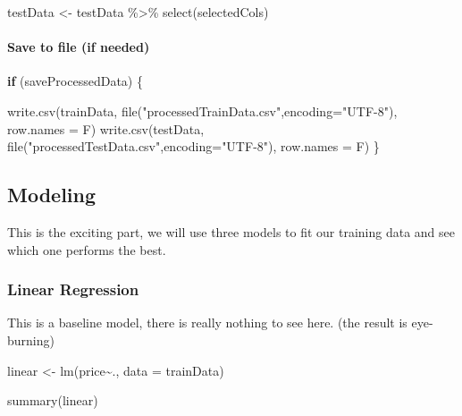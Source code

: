 \documentclass[
]{article}
\newenvironment{Shaded}{\begin{snugshade}}{\end{snugshade}}
\newcommand{\AttributeTok}[1]{\textcolor[rgb]{0.77,0.63,0.00}{#1}}
\newcommand{\ControlFlowTok}[1]{\textcolor[rgb]{0.13,0.29,0.53}{\textbf{#1}}}
\newcommand{\FunctionTok}[1]{\textcolor[rgb]{0.00,0.00,0.00}{#1}}
\newcommand{\NormalTok}[1]{#1}
\newcommand{\OtherTok}[1]{\textcolor[rgb]{0.56,0.35,0.01}{#1}}
\newcommand{\SpecialCharTok}[1]{\textcolor[rgb]{0.00,0.00,0.00}{#1}}
\newcommand{\StringTok}[1]{\textcolor[rgb]{0.31,0.60,0.02}{#1}}
\begin{document}
\begin{Shaded}
\begin{Highlighting}[]
\NormalTok{testData }\OtherTok{\textless{}{-}}\NormalTok{ testData }\SpecialCharTok{\%\textgreater{}\%} \FunctionTok{select}\NormalTok{(selectedCols)}
\end{Highlighting}
\end{Shaded}

\hypertarget{save-to-file-if-needed}{%
\paragraph{Save to file (if needed)}\label{save-to-file-if-needed}}

\begin{Shaded}
\begin{Highlighting}[]
\ControlFlowTok{if}\NormalTok{ (saveProcessedData) \{}
  
  \FunctionTok{write.csv}\NormalTok{(trainData,}
            \FunctionTok{file}\NormalTok{(}\StringTok{"processedTrainData.csv"}\NormalTok{,}\AttributeTok{encoding=}\StringTok{"UTF{-}8"}\NormalTok{),}
            \AttributeTok{row.names =}\NormalTok{ F)}
  \FunctionTok{write.csv}\NormalTok{(testData,}
            \FunctionTok{file}\NormalTok{(}\StringTok{"processedTestData.csv"}\NormalTok{,}\AttributeTok{encoding=}\StringTok{"UTF{-}8"}\NormalTok{),}
            \AttributeTok{row.names =}\NormalTok{ F)}
\NormalTok{\}}
\end{Highlighting}
\end{Shaded}

\hypertarget{modeling}{%
\subsection{Modeling}\label{modeling}}

This is the exciting part, we will use three models to fit our training
data and see which one performs the best.

\hypertarget{linear-regression}{%
\subsubsection{Linear Regression}\label{linear-regression}}

This is a baseline model, there is really nothing to see here. (the
result is eye-burning)

\begin{Shaded}
\begin{Highlighting}[]
\NormalTok{linear }\OtherTok{\textless{}{-}} \FunctionTok{lm}\NormalTok{(price}\SpecialCharTok{\textasciitilde{}}\NormalTok{., }\AttributeTok{data =}\NormalTok{ trainData)}

\FunctionTok{summary}\NormalTok{(linear)}
\end{Highlighting}
\end{Shaded}
\end{document}
